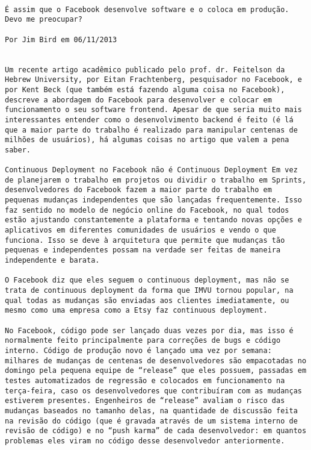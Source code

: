 \begin{verbatim}

É assim que o Facebook desenvolve software e o coloca em produção. Devo me preocupar?

Por Jim Bird em	06/11/2013
  
 
Um recente artigo acadêmico publicado pelo prof. dr. Feitelson da
Hebrew University, por Eitan Frachtenberg, pesquisador no Facebook, e
por Kent Beck (que também está fazendo alguma coisa no Facebook),
descreve a abordagem do Facebook para desenvolver e colocar em
funcionamento o seu software frontend. Apesar de que seria muito mais
interessantes entender como o desenvolvimento backend é feito (é lá
que a maior parte do trabalho é realizado para manipular centenas de
milhões de usuários), há algumas coisas no artigo que valem a pena
saber.

Continuous Deployment no Facebook não é Continuous Deployment Em vez
de planejarem o trabalho em projetos ou dividir o trabalho em Sprints,
desenvolvedores do Facebook fazem a maior parte do trabalho em
pequenas mudanças independentes que são lançadas frequentemente. Isso
faz sentido no modelo de negócio online do Facebook, no qual todos
estão ajustando constantemente a plataforma e tentando novas opções e
aplicativos em diferentes comunidades de usuários e vendo o que
funciona. Isso se deve à arquitetura que permite que mudanças tão
pequenas e independentes possam na verdade ser feitas de maneira
independente e barata.

O Facebook diz que eles seguem o continuous deployment, mas não se
trata de continuous deployment da forma que IMVU tornou popular, na
qual todas as mudanças são enviadas aos clientes imediatamente, ou
mesmo como uma empresa como a Etsy faz continuous deployment.

No Facebook, código pode ser lançado duas vezes por dia, mas isso é
normalmente feito principalmente para correções de bugs e código
interno. Código de produção novo é lançado uma vez por semana:
milhares de mudanças de centenas de desenvolvedores são empacotadas no
domingo pela pequena equipe de “release” que eles possuem, passadas em
testes automatizados de regressão e colocados em funcionamento na
terça-feira, caso os desenvolvedores que contribuíram com as mudanças
estiverem presentes. Engenheiros de “release” avaliam o risco das
mudanças baseados no tamanho delas, na quantidade de discussão feita
na revisão do código (que é gravada através de um sistema interno de
revisão de código) e no “push karma” de cada desenvolvedor: em quantos
problemas eles viram no código desse desenvolvedor anteriormente.


\end{verbatim}
